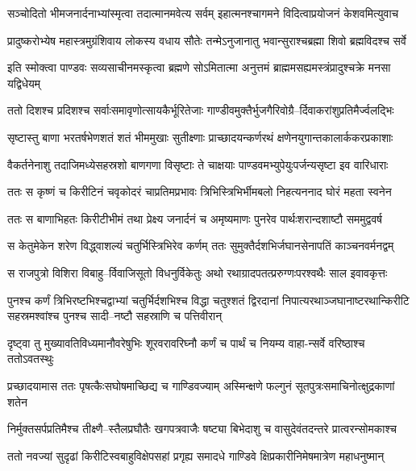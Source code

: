 \twolineshloka
{सञ्चोदितो भीमजनार्दनाभ्यांस्मृत्वा तदात्मानमवेत्य सर्वम्}
{इहात्मनश्चागमने विदित्वाप्रयोजनं केशवमित्युवाच}


\twolineshloka
{प्रादुष्करोभ्येष महास्त्रमुग्रंशिवाय लोकस्य वधाय सौतेः}
{तन्मेऽनुजानातु भवान्सुराश्चब्रह्मा शिवो ब्रह्मविदश्च सर्वे}


\twolineshloka
{इति स्मोक्त्वा पाण्डवः सव्यसाचीनमस्कृत्वा ब्रह्मणे सोऽमितात्मा}
{अनुत्तमं ब्राह्ममसह्यमस्त्रंप्रादुश्चक्रे मनसा यद्विधेयम्}


\twolineshloka
{ततो दिशश्च प्रदिशश्च सर्वाःसमावृणोत्सायकैर्भूरितेजाः}
{गाण्डीवमुक्तैर्भुजगैरिवोग्रै--र्दिवाकरांशुप्रतिमैर्ज्वलद्भिः}


\twolineshloka
{सृष्टास्तु बाणा भरतर्षभेणशतं शतं भीममुखाः सुतीक्ष्णाः}
{प्राच्छादयन्कर्णरथं क्षणेनयुगान्तकालार्ककरप्रकाशाः}


\twolineshloka
{वैकर्तनेनाशु तदाजिमध्येसहस्रशो बाणगणा विसृष्टाः}
{ते चाक्षयाः पाण्डवमभ्युपेयुःपर्जन्यसृष्टा इव वारिधाराः}


\twolineshloka
{ततः स कृष्णं च किरीटिनं चवृकोदरं चाप्रतिमप्रभावः}
{त्रिभिस्त्रिभिर्भीमबलो निहत्यननाद घोरं महता स्वनेन}


\twolineshloka
{ततः स बाणाभिहतः किरीटीभीमं तथा प्रेक्ष्य जनार्दनं च}
{अमृष्यमाणः पुनरेव पार्थःशरान्दशाष्टौ सममुद्ववर्ष}


\twolineshloka
{स केतुमेकेन शरेण विद्ध्वाशल्यं चतुर्भिस्त्रिभिरेव कर्णम्}
{ततः सुमुक्तैर्दशभिर्जघानसेनापतिं काञ्चनवर्मनद्वम्}


\twolineshloka
{स राजपुत्रो विशिरा विबाहु--र्विवाजिसूतो विधनुर्विकेतुः}
{अथो रथाग्रादपतत्प्ररुग्णःपरश्वथैः साल इवावकृत्तः}


\threelineshloka
{पुनश्च कर्णं त्रिभिरष्टभिश्चद्वाभ्यां चतुर्भिर्दशभिश्च विद्धा}
{चतुश्शतं द्विरदानां निपात्यरथाञ्जघानाष्टरथान्किरीटि}
{सहस्रमश्वांश्च पुनश्च सादी--नष्टौ सहस्राणि च पत्तिवीरान्}


\twolineshloka
{दृष्ट्वा तु मुख्यावतिविध्यमानौवरेषुभिः शूरवरावरिघ्नौ}
{कर्णं च पार्थं च नियम्य वाहा-न्सर्वे वरिष्ठाश्च ततोऽवतस्थुः}


\twolineshloka
{प्रच्छादयामास ततः पृषत्कैःसघोषमाच्छिद्य च गाण्डिवज्याम्}
{अस्मिन्क्षणे फल्गुनं सूतपुत्रःसमाचिनोत्क्षुद्रकाणां शतेन}


\twolineshloka
{निर्मुक्तसर्पप्रतिमैश्च तीक्ष्णै--स्तैलप्रघौतैः खगपत्रवाजैः}
{षष्ट्या बिभेदाशु च वासुदेवंतदन्तरे प्रात्वरन्सोमकाश्च}


\twolineshloka
{ततो नवज्यां सुदृढां किरीटिस्वबाहुविक्षेपसहां प्रगृह्य}
{समादधे गाण्डिवे क्षिप्रकारीनिमेषमात्रेण महाधनुष्मान्}


